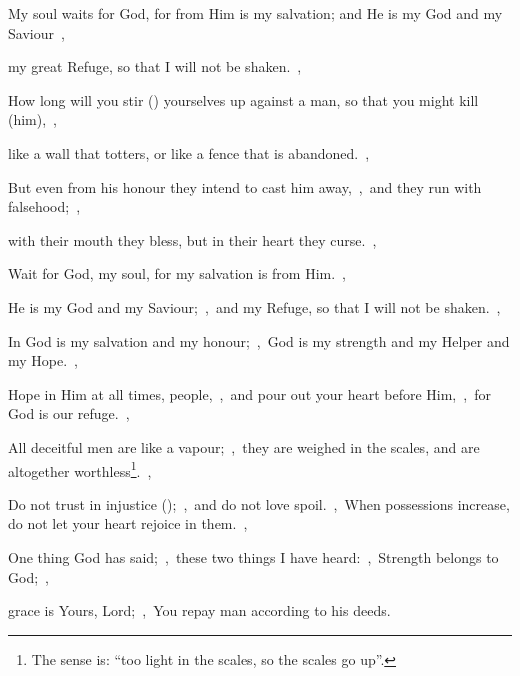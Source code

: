 \documentclass[12pt,twoside,a5paper]{article}
\begin{document}



\begin{normalparskip}
  My soul waits for God, for from Him is my salvation; and He is my God and my Saviour~\sep


  my great Refuge, so that I will not be shaken.~\sep

  How long will you stir () yourselves up against a man, so that you might kill (him),~\sep

  like a wall that totters, or like a fence that is abandoned.~\sep

  But even from his honour they intend to cast him away,~\sep\ and they run with falsehood;~\sep

  with their mouth they bless, but in their heart they curse.~\sep

  Wait for God, my soul, for my salvation is from Him.~\sep

  He is my God and my Saviour;~\sep\ and my Refuge, so that I will not be shaken.~\sep

  In God is my salvation and my honour;~\sep\ God is my strength and my Helper and my Hope.~\sep

  Hope in Him at all times, people,~\sep\ and pour out your heart before Him,~\sep\ for God is our refuge.~\sep

  All deceitful men are like a vapour;~\sep\ they are weighed in the scales, and are altogether worthless\footnote{The sense is: ``too light in the scales, so the scales go up''.}.~\sep

  Do not trust in injustice ();~\sep\ and do not love spoil.~\sep\ When possessions increase, do not let your heart rejoice in them.~\sep

  One thing God has said;~\sep\ these two things I have heard:~\sep\ Strength belongs to God;~\sep

  grace is Yours, Lord;~\sep\ You repay man according to his deeds.
\end{normalparskip}

\end{document}
